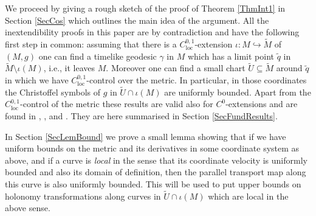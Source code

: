 \documentclass[reqno]{article}
\newcommand{\loc}{\mathrm{loc}}
\begin{document}
We proceed by giving a rough sketch of the proof of Theorem \ref{ThmInt1} in Section \ref{SecCos} which outlines the main idea of the argument. All the inextendibility proofs in this paper are by contradiction and have the following first step in common: assuming that there is  a $C^{0,1}_{\loc}$-extension $\iota : M \hookrightarrow \tilde{M}$ of $(M,g)$ one can find a  timelike geodesic $\gamma$ in $M$ which has a limit point $\tilde{q}$ in $\tilde{M} \setminus \iota(M)$, i.e., it leaves $M$. Moreover one can find a small chart $\tilde{U} \subseteq \tilde{M}$ around $\tilde{q}$  in which we have $C^{0,1}_{\loc}$-control over the metric. In particular, in those coordinates the Christoffel symbols of $g$ in $\tilde{U} \cap \iota(M)$ are uniformly bounded. Apart from the $C^{0,1}_{\loc}$-control of the metric these results are valid also for $C^0$-extensions and are found in \cite{Sbie15}, \cite{GalLinSbi17},  and \cite{Sbie18}. They are here summarised in Section \ref{SecFundResults}. 

In Section \ref{SecLemBound} we prove a small lemma showing that if we have uniform bounds on the metric and its derivatives in some coordinate system as above, and if a curve is \emph{local} in the sense that its coordinate velocity is uniformly bounded and also its domain of definition, then the parallel transport map along this curve is also uniformly bounded. This will be used to put upper bounds on holonomy transformations along curves in $\tilde{U} \cap \iota(M)$ which are local in the above sense.
\end{document}

